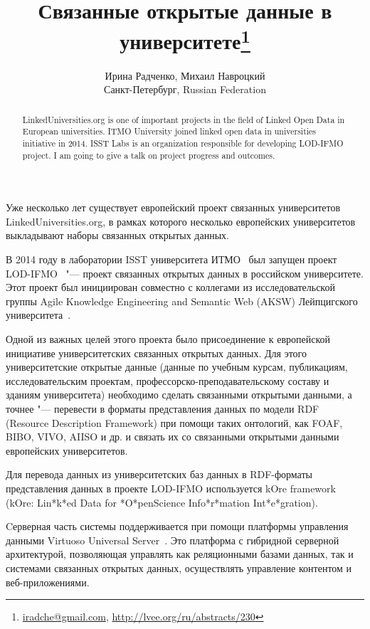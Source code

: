 \documentclass[10pt, a5paper]{article}
\begin{document}
\title{Связанные открытые данные в университете\footnote{\url{iradche@gmail.com}, \url{http://lvee.org/ru/abstracts/230}}}
\author{Ирина Радченко, Михаил Навроцкий \\Санкт-Петербург, Russian Federation}
\maketitle
\begin{abstract}
LinkedUniversities.org is one of important projects in the field of Linked Open Data in European universities.
ITMO \linebreak University joined linked open data in universities initiative in 2014. ISST Labs is an organization responsible for developing LOD-IFMO project. I am going to give a talk on project progress and outcomes.
\end{abstract}
Уже несколько лет существует европейский проект связанных университетов LinkedUniversities.org, в рамках которого несколько европейских университетов выкладывают наборы связанных открытых данных.

В 2014 году в лаборатории ISST университета ИТМО~\cite{Radchenko1} был запущен проект LOD-IFMO~\cite{Radchenko2} "--- проект связанных открытых данных в российском университете. Этот проект был инициирован совместно с коллегами из исследовательской группы Agile Knowledge Engineering and Semantic Web (AKSW) Лейпцигского университета~\cite{Radchenko3}.

Одной из важных целей этого проекта было присоединение к европейской инициативе университетских связанных открытых данных. Для этого университетские открытые данные (данные по учебным курсам, публикациям, исследовательским проектам, \linebreak профессорско-преподавательскому составу и зданиям университета) необходимо сделать связанными открытыми данными, а точнее "--- перевести в форматы представления данных по модели RDF (Resource Description Framework) при помощи таких онтологий, как FOAF, BIBO, VIVO, AIISO и др. и связать их со связанными открытыми данными европейских университетов.

Для перевода данных из университетских баз данных в RDF-форматы представления данных в проекте LOD-IFMO используется kOre framework (kOre: Lin*k*ed Data for *O*penScience \linebreak Info*r*mation Int*e*gration).

Cерверная часть системы поддерживается при помощи платформы управления данными Virtuoso Universal Server~\cite{Radchenko4}. Это платформа с гибридной серверной архитектурой, позволяющая управлять как реляционными базами данных, так и системами связанных открытых данных, осуществлять управление контентом и веб-приложениями.
\end{document}
